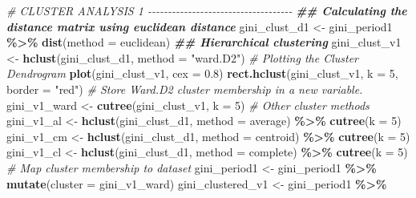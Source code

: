 \documentclass[11pt,a4paper,]{article}
\newenvironment{Shaded}{\begin{snugshade}}{\end{snugshade}}
\newcommand{\AttributeTok}[1]{\textcolor[rgb]{0.13,0.29,0.53}{#1}}
\newcommand{\CommentTok}[1]{\textcolor[rgb]{0.56,0.35,0.01}{\textit{#1}}}
\newcommand{\DecValTok}[1]{\textcolor[rgb]{0.00,0.00,0.81}{#1}}
\newcommand{\DocumentationTok}[1]{\textcolor[rgb]{0.56,0.35,0.01}{\textbf{\textit{#1}}}}
\newcommand{\FloatTok}[1]{\textcolor[rgb]{0.00,0.00,0.81}{#1}}
\newcommand{\FunctionTok}[1]{\textcolor[rgb]{0.13,0.29,0.53}{\textbf{#1}}}
\newcommand{\NormalTok}[1]{#1}
\newcommand{\OtherTok}[1]{\textcolor[rgb]{0.56,0.35,0.01}{#1}}
\newcommand{\SpecialCharTok}[1]{\textcolor[rgb]{0.81,0.36,0.00}{\textbf{#1}}}
\newcommand{\StringTok}[1]{\textcolor[rgb]{0.31,0.60,0.02}{#1}}
\begin{document}
\begin{Shaded}
\begin{Highlighting}[]
\CommentTok{\# CLUSTER ANALYSIS 1  {-}{-}{-}{-}{-}{-}{-}{-}{-}{-}{-}{-}{-}{-}{-}{-}{-}{-}{-}{-}{-}{-}{-}{-}{-}{-}{-}{-}{-}{-}{-}{-}{-}{-}{-}{-}}
\DocumentationTok{\#\# Calculating the distance matrix using euclidean distance}
\NormalTok{gini\_clust\_d1 }\OtherTok{\textless{}{-}}\NormalTok{ gini\_period1 }\SpecialCharTok{\%\textgreater{}\%}
  \FunctionTok{dist}\NormalTok{(}\AttributeTok{method =} \StringTok{\textquotesingle{}euclidean\textquotesingle{}}\NormalTok{)}
\DocumentationTok{\#\# Hierarchical clustering }
\NormalTok{gini\_clust\_v1 }\OtherTok{\textless{}{-}} \FunctionTok{hclust}\NormalTok{(gini\_clust\_d1, }\AttributeTok{method =} \StringTok{"ward.D2"}\NormalTok{)}
\CommentTok{\# Plotting the Cluster Dendrogram}
\FunctionTok{plot}\NormalTok{(gini\_clust\_v1, }\AttributeTok{cex =} \FloatTok{0.8}\NormalTok{)}
\FunctionTok{rect.hclust}\NormalTok{(gini\_clust\_v1, }\AttributeTok{k =} \DecValTok{5}\NormalTok{, }\AttributeTok{border =} \StringTok{"red"}\NormalTok{)}
\CommentTok{\# Store Ward.D2 cluster membership in a new variable.}
\NormalTok{gini\_v1\_ward }\OtherTok{\textless{}{-}} \FunctionTok{cutree}\NormalTok{(gini\_clust\_v1, }\AttributeTok{k =} \DecValTok{5}\NormalTok{)}
\CommentTok{\# Other cluster methods}
\NormalTok{gini\_v1\_al }\OtherTok{\textless{}{-}} \FunctionTok{hclust}\NormalTok{(gini\_clust\_d1, }\AttributeTok{method =} \StringTok{\textquotesingle{}average\textquotesingle{}}\NormalTok{) }\SpecialCharTok{\%\textgreater{}\%} \FunctionTok{cutree}\NormalTok{(}\AttributeTok{k =} \DecValTok{5}\NormalTok{)   }
\NormalTok{gini\_v1\_cm }\OtherTok{\textless{}{-}} \FunctionTok{hclust}\NormalTok{(gini\_clust\_d1, }\AttributeTok{method =} \StringTok{\textquotesingle{}centroid\textquotesingle{}}\NormalTok{) }\SpecialCharTok{\%\textgreater{}\%} \FunctionTok{cutree}\NormalTok{(}\AttributeTok{k =} \DecValTok{5}\NormalTok{)   }
\NormalTok{gini\_v1\_cl }\OtherTok{\textless{}{-}} \FunctionTok{hclust}\NormalTok{(gini\_clust\_d1, }\AttributeTok{method =} \StringTok{\textquotesingle{}complete\textquotesingle{}}\NormalTok{) }\SpecialCharTok{\%\textgreater{}\%} \FunctionTok{cutree}\NormalTok{(}\AttributeTok{k =} \DecValTok{5}\NormalTok{) }
\CommentTok{\# Map cluster membership to dataset}
\NormalTok{gini\_period1 }\OtherTok{\textless{}{-}}\NormalTok{ gini\_period1 }\SpecialCharTok{\%\textgreater{}\%} \FunctionTok{mutate}\NormalTok{(}\AttributeTok{cluster =}\NormalTok{ gini\_v1\_ward)}
\NormalTok{gini\_clustered\_v1 }\OtherTok{\textless{}{-}}\NormalTok{ gini\_period1 }\SpecialCharTok{\%\textgreater{}\%}

\end{Highlighting}
\end{Shaded}
\end{document}
